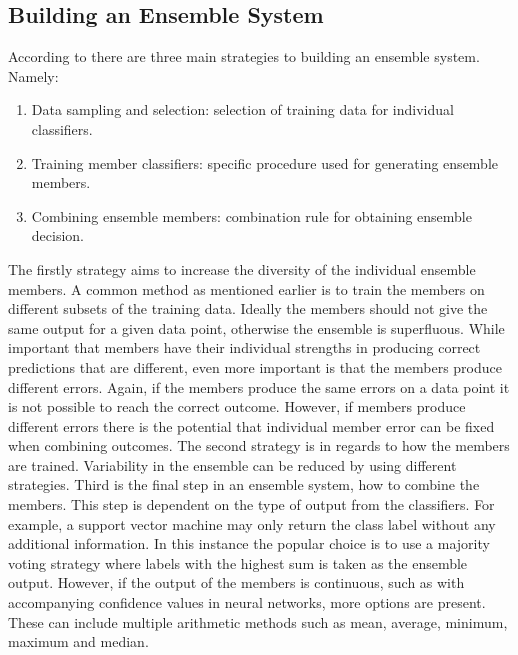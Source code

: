 \subsection{Building an Ensemble System}
According to \cite{ensemblebook} there are three main strategies to building an ensemble system. Namely:

\begin{enumerate}
	\item Data sampling and selection: selection of training data for individual classifiers.
	\item Training member classifiers: specific procedure used for generating ensemble members.
	\item Combining ensemble members: combination rule for obtaining ensemble decision.
\end{enumerate}

The firstly strategy aims to increase the diversity of the individual ensemble members. A common method as mentioned earlier is to train the members on different subsets of the training data. Ideally the members should not give the same output for a given data point, otherwise the ensemble is superfluous. While important that members have their individual strengths in producing correct predictions that are different, even more important is that the members produce different errors. Again, if the members produce the same errors on a data point it is not possible to reach the correct outcome. However, if members produce different errors there is the potential that individual member error can be fixed when combining outcomes. The second strategy is in regards to how the members are trained. Variability in the ensemble can be reduced by using different strategies. Third is the final step in an ensemble system, how to combine the members. This step is dependent on the type of output from the classifiers. For example, a support vector machine may only return the class label without any additional information. In this instance the popular choice is to use a majority voting strategy where labels with the highest sum is taken as the ensemble output. However, if the output of the members is continuous, such as with accompanying confidence values in neural networks, more options are present. These can include multiple arithmetic methods such as mean, average, minimum, maximum and median.


